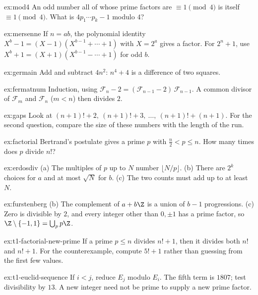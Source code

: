 \begin{hint}{ex:mod4}
An odd number all of whose prime factors are $\equiv1\pmod4$ is itself $\equiv1\pmod4$. What is $4p_1\cdots p_k-1$ modulo $4$?
\end{hint}
\begin{hint}{ex:mersenne}
If $n=ab$, the polynomial identity $X^b-1=(X-1)(X^{b-1}+\cdots+1)$ with $X=2^a$ gives a factor. For $2^n+1$, use $X^b+1=(X+1)(X^{b-1}-\cdots+1)$ for odd $b$.
\end{hint}
\begin{hint}{ex:germain}
Add and subtract $4n^2$: $n^4+4$ is a difference of two squares.
\end{hint}
\begin{hint}{ex:fermatnum}
Induction, using $\mathcal F_n-2=(\mathcal F_{n-1}-2)\,\mathcal F_{n-1}$. A common divisor of $\mathcal F_m$ and $\mathcal F_n$ ($m<n$) then divides $2$.
\end{hint}
\begin{hint}{ex:gaps}
Look at $(n+1)!+2,\ (n+1)!+3,\ \dots,\ (n+1)!+(n+1)$. For the second question, compare the size of these numbers with the length of the run.
\end{hint}
\begin{hint}{ex:factorial}
Bertrand's postulate gives a prime $p$ with $\frac n2<p\le n$. How many times does $p$ divide $n!$?
\end{hint}
\begin{hint}{ex:erdosdiv}
(a) The multiples of $p$ up to $N$ number $\lfloor N/p\rfloor$. (b) There are $2^k$ choices for $a$ and at most $\sqrt N$ for $b$. (c) The two counts must add up to at least $N$.
\end{hint}
\begin{hint}{ex:furstenberg}
(b) The complement of $a+b\Z$ is a union of $b-1$ progressions. (c) Zero is divisible by $2$, and every integer other than $0,\pm1$ has a prime factor, so $\Z\setminus\{-1,1\}=\bigcup_p p\Z$.
\end{hint}

\begin{hint}{ex:t1-factorial-new-prime}
If a prime $p\le n$ divides $n!+1$, then it divides both $n!$ and $n!+1$. For the counterexample, compute $5!+1$ rather than guessing from the first few values.
\end{hint}
\begin{hint}{ex:t1-euclid-sequence}
If $i<j$, reduce $E_j$ modulo $E_i$. The fifth term is $1807$; test divisibility by $13$. A new integer need not be prime to supply a new prime factor.
\end{hint}

